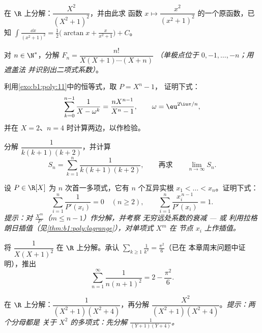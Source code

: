 \begin{exercise}[$\star\star$]\label{exo:b1:fractions:5}
在 $\R$ 上分解：$\dfrac{X^2}{(X^2 + 1)^2}$，并由此求
函数 $x \mapsto \dfrac{x^2}{(x^2+1)^2}$ 的一个原函数，已知
$\int \frac{\dd x}{(x^2+1)^2} = \frac12\bigl(\arctan x +
\frac{x}{x^2+1}\bigr) + C$。
\end{exercise}

\begin{exercise}[$\star\star$]\label{exo:b1:fractions:6}
对 $n \in \N^*$，分解 $F_n = \dfrac{n!}{X(X+1)\cdots(X+n)}$
\emph{（单极点位于 $0, -1, \dots, -n$；用遮盖法
并识别出二项式系数）}。
\end{exercise}

\begin{exercise}[$\star\star$]\label{exo:b1:fractions:7}
利用\cref{exo:b1:poly:11}中的恒等式，取 $P = X^n - 1$，
证明下式：
\[
\sum_{k=0}^{n-1} \frac{1}{X - \omega^k} = \frac{n X^{n-1}}{X^n - 1},
\qquad \omega = \eu^{2\iu\pi/n},
\]
并在 $X = 2$、$n = 4$ 时计算两边，以作检验。
\end{exercise}

\begin{exercise}[$\star\star$]\label{exo:b1:fractions:8}
分解 $\dfrac{1}{k(k+1)(k+2)}$，并计算
\[
S_n = \sum_{k=1}^{n} \frac{1}{k(k+1)(k+2)},
\qquad\text{再求}\qquad
\lim_{n \to \infty} S_n .
\]
\end{exercise}

\begin{exercise}[$\star\star\star$]\label{exo:b1:fractions:9}
设 $P \in \R[X]$ 为 $n$ 次首一多项式，它有 $n$ 个互异实根
$x_1 < \dots < x_n$。证明下式：
\[
\sum_{i=1}^{n} \frac{1}{P'(x_i)} = 0 \quad (n \geq 2),
\qquad
\sum_{i=1}^{n} \frac{x_i^{\,n-1}}{P'(x_i)} = 1 .
\]
\emph{提示：对 $\frac{X^m}{P}$（$m \leq n - 1$）作分解，并考察
无穷远处系数的衰减 --- 或
利用拉格朗日插值（见\cref{thm:b1:poly:lagrange}），对单项式 $X^m$ 在
节点 $x_i$ 上作插值。}
\end{exercise}

\begin{exercise}[$\star\star$]\label{exo:b1:fractions:10}
将 $\dfrac{1}{X(X+1)^2}$ 在 $\R$ 上分解。承认
$\sum_{k \geq 1} \frac1{k^2} = \frac{\pi^2}6$（已在
本章周末问题中证明），推出
\[
\sum_{n=1}^{\infty} \frac{1}{n(n+1)^2} = 2 - \frac{\pi^2}{6} .
\]
\end{exercise}

\begin{exercise}[$\star\star$]\label{exo:b1:fractions:11}
在 $\R$ 上分解：$\dfrac{1}{(X^2+1)(X^2+4)}$，再分解
$\dfrac{X^2}{(X^2+1)(X^2+4)}$。\emph{提示：两个分母都是
关于 $X^2$ 的多项式：先分解 $\frac1{(Y+1)(Y+4)}$。}
\end{exercise}

